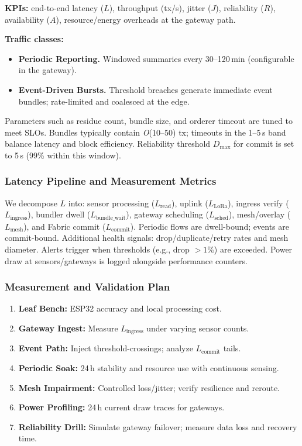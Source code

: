 \documentclass[12pt,onecolumn]{IEEEtran} %
\begin{document}
\textbf{KPIs:} end-to-end latency ($L$), throughput (tx/s), jitter ($J$), reliability ($R$), availability ($A$), resource/energy overheads at the gateway path.

\textbf{Traffic classes:}
\begin{itemize}
    \item \textbf{Periodic Reporting.} Windowed summaries every 30--120\,min (configurable in the gateway).
    \item \textbf{Event-Driven Bursts.} Threshold breaches generate immediate event bundles; rate-limited and coalesced at the edge.
\end{itemize}

Parameters such as residue count, bundle size, and orderer timeout are tuned to meet SLOs. Bundles typically contain \emph{O}(10–50) tx; timeouts in the 1–5\,s band balance latency and block efficiency. Reliability threshold $D_{\max}$ for commit is set to 5\,s (99\% within this window).

\subsubsection{Latency Pipeline and Measurement Metrics}
\label{subsubsec:latency-pipeline}

We decompose $L$ into: sensor processing ($L_{\text{read}}$), uplink ($L_{\text{LoRa}}$), ingress verify ($L_{\text{ingress}}$), bundler dwell ($L_{\text{bundle\_wait}}$), gateway scheduling ($L_{\text{sched}}$), mesh/overlay ($L_{\text{mesh}}$), and Fabric commit ($L_{\text{commit}}$). Periodic flows are dwell-bound; events are commit-bound. Additional health signals: drop/duplicate/retry rates and mesh diameter. Alerts trigger when thresholds (e.g., drop $>1\%$) are exceeded. Power draw at sensors/gateways is logged alongside performance counters.

\subsubsection{Measurement and Validation Plan}
\label{subsubsec:measurement-plan}

\begin{enumerate}
    \item \textbf{Leaf Bench:} ESP32 accuracy and local processing cost.
    \item \textbf{Gateway Ingest:} Measure $L_{\text{ingress}}$ under varying sensor counts.
    \item \textbf{Event Path:} Inject threshold-crossings; analyze $L_{\text{commit}}$ tails.
    \item \textbf{Periodic Soak:} 24\,h stability and resource use with continuous sensing.
    \item \textbf{Mesh Impairment:} Controlled loss/jitter; verify resilience and reroute.
    \item \textbf{Power Profiling:} 24\,h current draw traces for gateways.
    \item \textbf{Reliability Drill:} Simulate gateway failover; measure data loss and recovery time.
\end{enumerate}
\end{document}

